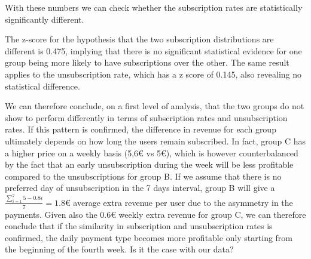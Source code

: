 \documentclass[paper=a4, fontsize=10pt]{report}
\begin{document}
With these numbers we can check whether the subscription rates are statistically significantly different.

The z-score for the hypothesis that the two subscription distributions are different is 0.475, implying that there is no significant statistical evidence for one group being more likely to have
subscriptions over the other. The same result applies to the unsubscription rate, which has a z score of 0.145, also revealing no statistical difference.

We can therefore conclude, on a first level of analysis, that the two groups do not show to perform differently in terms of subscription rates and unsubscription rates. If this 
pattern is confirmed, the difference in revenue for each group ultimately depends on how long the users remain subscribed. In fact, group C has a higher
price on a weekly basis (5,6€ vs 5€), which is
however counterbalanced by the fact that an early unsubscription during the week will be less profitable compared to the unsubscriptions for group B. 
If we assume that there is no preferred day of unsubscription in the 7 days interval, group B will give a $ \frac{\sum_{i=1}^{7} 5-0.8i}{7} =1.8$€ average
extra revenue per user due to the asymmetry in the payments. Given also the 0.6€ weekly extra revenue for group C, we can therefore conclude that if the similarity 
in subscription and
unsubscription rates is confirmed, the daily payment type becomes more profitable only starting from the beginning of the fourth week. 
Is it the case with our data?
\end{document}
